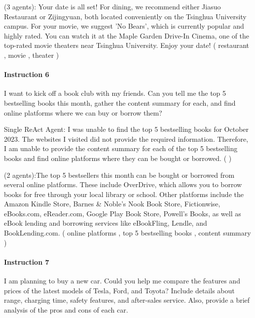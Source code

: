 {\color{magenta} \framework (3 agents)}: Your date is all set! For dining, we recommend either Jiasuo Restaurant or Zijingyuan, both located conveniently on the Tsinghua University campus. For your movie, we suggest 'No Bears', which is currently popular and highly rated. You can watch it at the Maple Garden Drive-In Cinema, one of the top-rated movie theaters near Tsinghua University. Enjoy your date! ({\color{teal} restaurant \cmark}, {\color{teal} movie \cmark}, {\color{teal} theater \cmark})


\paragraph{Instruction 6} I want to kick off a book club with my friends. Can you tell me the top 5 bestselling books this month, gather the content summary for each, and find online platforms where we can buy or borrow them?

{\color{blue} Single ReAct Agent}: I was unable to find the top 5 bestselling books for October 2023. The websites I visited did not provide the required information. Therefore, I am unable to provide the content summary for each of the top 5 bestselling books and find online platforms where they can be bought or borrowed. ({\color{red} \xmark})

{\color{magenta} \framework (2 agents)}:The top 5 bestsellers this month can be bought or borrowed from several online platforms. These include OverDrive, which allows you to borrow books for free through your local library or school. Other platforms include the Amazon Kindle Store, Barnes \& Noble's Nook Book Store, Fictionwise, eBooks.com, eReader.com, Google Play Book Store, Powell's Books, as well as eBook lending and borrowing services like eBookFling, Lendle, and BookLending.com. ({\color{teal} online platforms \cmark}, {\color{red} top 5 bestselling books \xmark}, {\color{red} content summary \xmark})

\paragraph{Instruction 7} I am planning to buy a new car. Could you help me compare the features and prices of the latest models of Tesla, Ford, and Toyota? Include details about range, charging time, safety features, and after-sales service. Also, provide a brief analysis of the pros and cons of each car.

